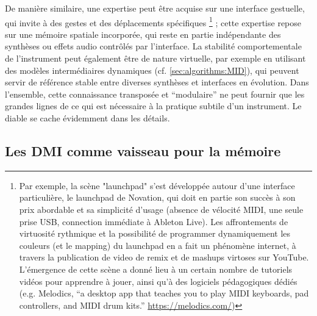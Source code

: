 \indent De manière similaire, une expertise peut être acquise sur une interface gestuelle, qui invite à des gestes et des déplacements spécifiques \footnote{Par exemple, la scène "launchpad" s'est développée autour d'une interface particulière, le launchpad de Novation, qui doit en partie son succès à son prix abordable et sa simplicité d'usage (absence de vélocité \gls{MIDI}, une seule prise \gls{USB}, connection immédiate à Ableton Live). Les affrontements de virtuosité rythmique et la possibilité de programmer dynamiquement les couleurs (et le mapping) du launchpad en a fait un phénomène internet, à travers la publication de video de remix et de mashups virtoses sur YouTube. L'émergence de cette scène a donné lieu à un certain nombre de tutoriels vidéos pour apprendre à jouer, ainsi qu'à des logiciels pédagogiques dédiés (e.g. Melodics, ``a desktop app that teaches you to play MIDI keyboards, pad controllers, and MIDI drum kits.'' \url{https://melodics.com/})} ; cette expertise repose sur une mémoire spatiale incorporée, qui reste en partie indépendante des synthèses ou effets audio contrôlés par l'interface. La stabilité comportementale de l'instrument peut également être de nature virtuelle, par exemple en utilisant des modèles intermédiaires dynamiques \cite{goudard_dynamic_2011} (cf. \ref{sec:algorithms:MID}), qui peuvent servir de référence stable entre diverses synthèses et interfaces en évolution.
\noindent Dans l'ensemble, cette connaissance transposée et ``modulaire'' ne peut fournir que les grandes lignes de ce qui est nécessaire à la pratique subtile d'un instrument. Le diable se cache évidemment dans les détails.


\subsection{Les DMI comme vaisseau pour la mémoire}
\label{sec:ephemeral:vessels}

